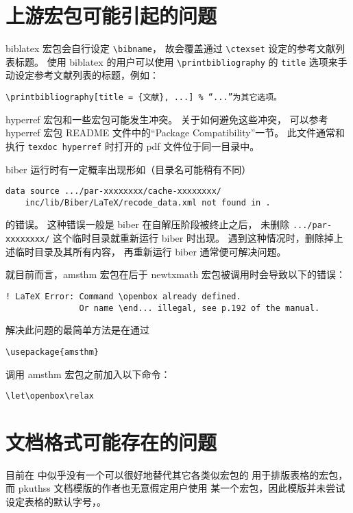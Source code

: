 \section{上游宏包可能引起的问题}

biblatex 宏包会自行设定 \verb|\bibname|，
故会覆盖通过 \verb|\ctexset| 设定的参考文献列表标题。
使用 biblatex 的用户可以使用 \verb|\printbibliography| 的
\verb|title| 选项来手动设定参考文献列表的标题，例如：
\begin{Verbatim}
\printbibliography[title = {文献}, ...] % “...”为其它选项。
\end{Verbatim}

hyperref 宏包和一些宏包可能发生冲突。
关于如何避免这些冲突，
可以参考 hyperref 宏包 README 文件中的“Package Compatibility”一节。
此文件通常和执行 \verb|texdoc hyperref|
时打开的 pdf 文件位于同一目录中。

biber 运行时有一定概率出现形如（目录名可能稍有不同）
\begin{Verbatim}
data source .../par-xxxxxxxx/cache-xxxxxxxx/
	inc/lib/Biber/LaTeX/recode_data.xml not found in .
\end{Verbatim}
的错误。
这种错误一般是 biber 在自解压阶段被终止之后，
未删除 \verb|.../par-xxxxxxxx/| 这个临时目录就重新运行 biber 时出现。
遇到这种情况时，删除掉上述临时目录及其所有内容，
再重新运行 biber 通常便可解决问题。

就目前而言，amsthm 宏包在后于 newtxmath
宏包被调用时会导致以下的错误：
\begin{Verbatim}
! LaTeX Error: Command \openbox already defined.
               Or name \end... illegal, see p.192 of the manual.
\end{Verbatim}
解决此问题的最简单方法是在通过
\begin{Verbatim}
\usepackage{amsthm}
\end{Verbatim}
调用 amsthm 宏包之前加入以下命令：
\begin{Verbatim}
\let\openbox\relax
\end{Verbatim}

\section{文档格式可能存在的问题}

目前在  中似乎没有一个可以很好地替代其它各类似宏包的
用于排版表格的宏包，而 pkuthss 文档模版的作者也无意假定用户使用
某一个宏包，因此模版并未尝试设定表格的默认字号，。

